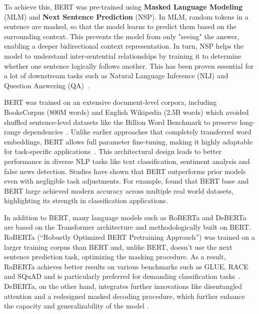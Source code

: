 To achieve this, BERT was pre-trained using \textbf{Masked Language Modeling} (MLM) and \textbf{Next Sentence Prediction} (NSP). In MLM, random tokens in a sentence are masked, so that the model learns to predict them based on the surrounding context. This prevents the model from only "seeing" the answer, enabling a deeper bidirectional context representation. In turn, NSP helps the model to understand inter-sentential relationships by training it to determine whether one sentence logically follows another. \cite{devlin2019bert} This has been proven essential for a lot of downstream tasks such as Natural Language Inference (NLI) and Question Answering (QA)~\parencite{sun2020finetuneberttextclassification}.

BERT was trained on an extensive document-level corpora, including BooksCorpus (800M words) and English Wikipedia (2.5B words) which avoided shuffled sentence-level datasets like the Billion Word Benchmark to preserve long-range dependencies~\parencite{devlin2019bert}. Unlike earlier approaches that completely transferred word embeddings, BERT allows full parameter fine-tuning, making it highly adaptable for task-specific applications~\parencite{korootev2021BERT}. This architectural design leads to better performance in diverse NLP tasks like text classification, sentiment analysis and false news detection. Studies have shown that BERT outperforms prior models even with negligible task adjustments. For example, \textcite{qasim2022fine} found that BERT base and BERT large achieved modern accuracy across multiple real world datasets, highlighting its strength in classification applications.

In addition to BERT, many language models such as RoBERTa \parencite{liu2019roberta} and DeBERTa \parencite{he2021deberta} are based on the Transformer architecture and methodologically built on BERT. RoBERTa (“Robustly Optimized BERT Pretraining Approach”) was trained on a larger training corpus than BERT and, unlike BERT, doesn't use the next sentence prediction task, optimizing the masking procedure. As a result, RoBERTa achieves better results on various benchmarks such as GLUE, RACE and SQuAD and is particularly preferred for demanding classification tasks~\parencite{liu2019roberta}. DeBERTa, on the other hand, integrates further innovations like disentangled attention and a redesigned masked decoding procedure, which further enhance the capacity and generalizability of the model \cite{he2021deberta, he2023debertav3}.


